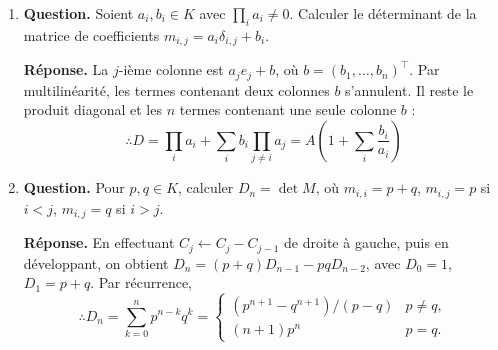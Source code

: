 \documentclass[12pt, a4paper]{article}
\begin{document}
\begin{enumerate}[label=5.\arabic*., start=54]
\begin{minipage}[t]{\linewidth}
\begin{enumerate}[\arabic*.]
Par élimination, $\det J=16$.

  \item \textbf{Question.} Calculer $AJ$.
\par\smallskip
\textbf{Réponse.} $AJ=J\operatorname{diag}(s_1,s_2,s_3,s_4)$.

  \item \textbf{Question.} En déduire $\det A$.
\par\smallskip
\textbf{Réponse.} $\det A=s_1s_2s_3s_4$.
        Si $\operatorname{car}K\neq2$, on prend les déterminants et on simplifie par $16$.
        En caractéristique $2$, le même résultat suit de l'identité polynomiale à coefficients entiers.

\end{enumerate}
\end{minipage}

  \item \begin{minipage}[t]{\linewidth}\raggedright
\textbf{Question.} Soient $a_i,b_i\in K$ avec $\prod_i a_i\neq0$. Calculer le déterminant de la matrice de coefficients $m_{i,j}=a_i\delta_{i,j}+b_i$.
\par\smallskip
\textbf{Réponse.} La $j$-ième colonne est $a_je_j+b$, où $b=(b_1,\ldots,b_n)^\top$.
    Par multilinéarité, les termes contenant deux colonnes $b$ s'annulent.
    Il reste le produit diagonal et les $n$ termes contenant une seule colonne $b$ :
    \[
      \therefore D=\prod_i a_i+\sum_i b_i\prod_{j\neq i}a_j
      =A\left(1+\sum_i\frac{b_i}{a_i}\right)
    \]
\end{minipage}

  \item \begin{minipage}[t]{\linewidth}\raggedright
\textbf{Question.} Pour $p,q\in K$, calculer $D_n=\det M$, où $m_{i,i}=p+q$, $m_{i,j}=p$ si $i<j$, $m_{i,j}=q$ si $i>j$.
\par\smallskip
\textbf{Réponse.} En effectuant $C_j\leftarrow C_j-C_{j-1}$ de droite à gauche, puis en développant, on obtient
    $D_n=(p+q)D_{n-1}-pqD_{n-2}$, avec $D_0=1$, $D_1=p+q$.
    Par récurrence,
    \[
      \therefore D_n=\sum_{k=0}^n p^{n-k}q^k
      =\begin{cases}(p^{n+1}-q^{n+1})/(p-q)&p\neq q,\\(n+1)p^n&p=q.\end{cases}
    \]
\end{minipage}


\end{enumerate}
\end{document}

